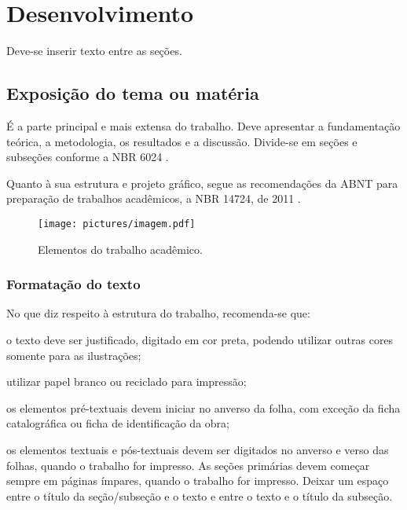 \chapter{Desenvolvimento}\label{cap:desenvolvimento}
Deve-se inserir texto entre as seções.

\section{Exposição do tema ou matéria}

É a parte principal e mais extensa do trabalho. Deve apresentar a fundamentação teórica, a metodologia, os resultados e a discussão. Divide-se em seções e subseções conforme a NBR 6024 \cite{NBR6024:2012}.

Quanto à sua estrutura e projeto gráfico, segue as recomendações da \gls{ABNT} para preparação de trabalhos acadêmicos, a NBR 14724, de 2011 \cite{NBR14724:2011}.

\begin{figure}[htb]
    \caption{\label{fig:Fig_1}Elementos do trabalho acadêmico.}
    \begin{center}
        \texttt{[image: pictures/imagem.pdf]}
    \end{center}
\end{figure}

\subsection{Formatação do texto}

No que diz respeito à estrutura do trabalho, recomenda-se que:
\begin{alineas}
    \item o texto deve ser justificado, digitado em cor preta, podendo utilizar outras cores somente para as ilustrações;
    \item utilizar papel branco ou reciclado para impressão;
    \item os elementos pré-textuais devem iniciar no anverso da folha, com exceção da ficha catalográfica ou ficha de identificação da obra;
    \item os elementos textuais e pós-textuais devem ser digitados no anverso e verso das folhas, quando o trabalho for impresso. As seções primárias devem começar sempre em páginas ímpares, quando o trabalho for impresso. Deixar um espaço entre o título da seção/subseção e o texto e entre o texto e o título da subseção.
\end{alineas}

